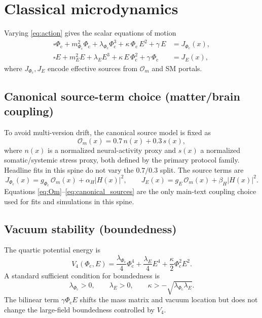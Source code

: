 \documentclass[reprint,amsmath,amssymb,aps,showkeys]{revtex4-2}
\theoremstyle{remark}
\newcommand{\Phic}{\Phi_{\mathrm{c}}}
\newcommand{\Eth}{E}
\newcommand{\cO}{\mathcal{O}}
\begin{document}
\section{Classical microdynamics}
Varying \eqref{eq:action} gives the scalar equations of motion
\begin{align}
\square \Phic + m_{\Phic}^2 \Phic + \lambda_{\Phic}\Phic^3 + \kappa\,\Phic\,\Eth^2 + \gamma\,\Eth
&= J_{\Phic}(x),
\label{eq:eom_phic}
\\
\square \Eth + m_{\Eth}^2 \Eth + \lambda_{\Eth}\Eth^3 + \kappa\,\Eth\,\Phic^2 + \gamma\,\Phic
&= J_{\Eth}(x),
\label{eq:eom_eth}
\end{align}
where $J_{\Phic},J_{\Eth}$ encode effective sources from $\cO_m$ and SM portals.

\subsection{Canonical source-term choice (matter/brain coupling)}
To avoid multi-version drift, the canonical source model is fixed as
\begin{equation}
\cO_m(x)=0.7\,n(x)+0.3\,s(x),
\label{eq:Om}
\end{equation}
where $n(x)$ is a normalized neural-activity proxy and $s(x)$ a normalized somatic/systemic stress proxy,
both defined by the primary protocol family. Headline fits in this spine do not vary the $0.7/0.3$ split.
The source terms are
\begin{equation}
J_{\Phic}(x)=g_{\Phic}\,\cO_m(x)+\alpha_H |H(x)|^2,\qquad
J_{\Eth}(x)=g_{\Eth}\,\cO_m(x)+\beta_H |H(x)|^2.
\label{eq:canonical_sources}
\end{equation}
Equations \eqref{eq:Om}--\eqref{eq:canonical_sources} are the only main-text coupling choice used for
fits and simulations in this spine.

\subsection{Vacuum stability (boundedness)}
The quartic potential energy is
\[
V_4(\Phic,\Eth)=\frac{\lambda_{\Phic}}{4}\Phic^4+\frac{\lambda_{\Eth}}{4}\Eth^4+\frac{\kappa}{2}\Phic^2\Eth^2.
\]
A standard sufficient condition for boundedness is
\begin{equation}
\lambda_{\Phic}>0,\qquad \lambda_{\Eth}>0,\qquad \kappa>-\sqrt{\lambda_{\Phic}\lambda_{\Eth}}.
\label{eq:stability}
\end{equation}
The bilinear term $\gamma\Phic\Eth$ shifts the mass matrix and vacuum location but does not
change the large-field boundedness controlled by $V_4$.
\end{document}
